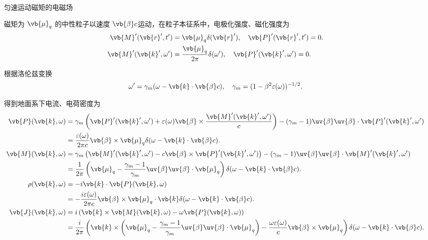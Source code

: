 \begin{exbox}
	匀速运动磁矩的电磁场

	磁矩为 \(\vb{\mu}_{q}\) 的中性粒子以速度 \(\vb{\beta}c\)运动，在粒子本征系中，电极化强度、磁化强度为
	\begin{align*}
		\vb{M}'(\vb{r}', t') &= \vb{\mu}_{q} \delta(\vb{r}'), \quad
		\vb{P}'(\vb{r}', t') = 0. \\
		\vb{M}'(\vb{k}', \omega') &= \frac{\vb{\mu}_{q}}{2\pi} \delta(\omega'), \quad
		\vb{P}'(\vb{k}', \omega') = 0.
	\end{align*}

	根据洛伦兹变换
	\begin{align*}
		\omega' = \gamma_{m} (\omega - \vb{k} \cdot \vb{\beta} c), \quad \gamma_{m} = (1 - \beta^{2} \varepsilon(\omega))^{-1/2}.
	\end{align*}

	得到地面系下电流、电荷密度为
	\begin{align*}
		\vb{P}(\vb{k}, \omega) &= \gamma_{m} \left( \vb{P}'(\vb{k}', \omega') + \varepsilon(\omega) \vb{\beta} \times \frac{\vb{M}'(\vb{k}', \omega')}{c} \right) - (\gamma_{m} - 1) \uv{\beta} \uv{\beta} \cdot \vb{P}'(\vb{k}', \omega') \\
		&= \frac{\varepsilon(\omega)}{2\pi c} \vb{\beta} \times \vb{\mu}_{q} \delta(\omega - \vb{k} \cdot \vb{\beta} c). \\
		\vb{M}(\vb{k}, \omega) &= \gamma_{m} \left( \vb{M}'(\vb{k}', \omega') - c \vb{\beta} \times \vb{P}'(\vb{k}', \omega') \right) - (\gamma_{m} - 1) \uv{\beta} \uv{\beta} \cdot \vb{M}'(\vb{k}', \omega') \\
		&= \frac{1}{2\pi} \left( \vb{\mu}_{q} - \frac{\gamma_{m} - 1}{\gamma_{m}} \uv{\beta} \uv{\beta} \cdot \vb{\mu}_{q} \right) \delta(\omega - \vb{k} \cdot \vb{\beta} c). \\
		\rho(\vb{k}, \omega) &= -i \vb{k} \cdot \vb{P}(\vb{k}, \omega) \\&= -\frac{i \varepsilon(\omega)}{2\pi c} \vb{\beta} \times \vb{\mu}_{q} \cdot \vb{k} \delta(\omega - \vb{k} \cdot \vb{\beta} c). \\
		\vb{J}(\vb{k}, \omega) &= i \left( \vb{k} \times \vb{M}(\vb{k}, \omega) - \omega \vb{P}(\vb{k}, \omega) \right) \\
		&= \frac{i}{2\pi} \left( \vb{k} \times \left( \vb{\mu}_{q} - \frac{\gamma_{m} - 1}{\gamma_{m}} \uv{\beta} \uv{\beta} \cdot \vb{\mu}_{q} \right) - \frac{\omega \varepsilon(\omega)}{c} \vb{\beta} \times \vb{\mu}_{q} \right) \delta(\omega - \vb{k} \cdot \vb{\beta} c).
	\end{align*}


\end{exbox}
